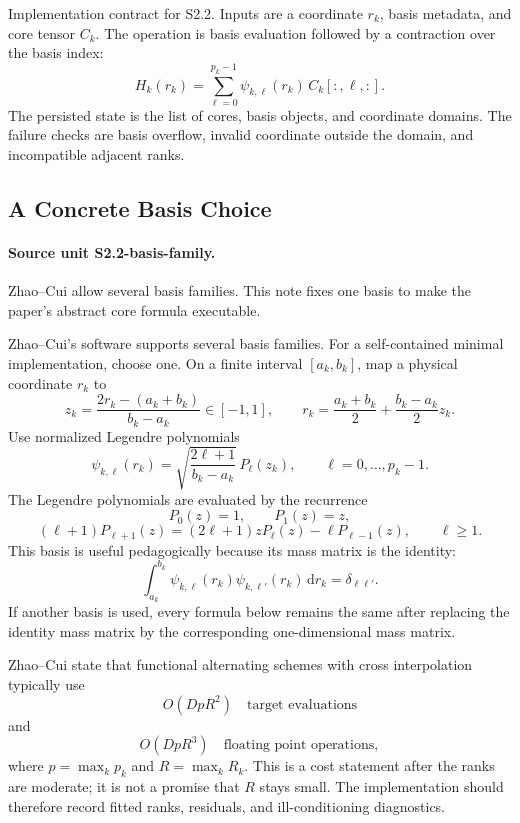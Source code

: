 \documentclass[11pt]{article}
\newcommand{\dd}{\,\mathrm d}
\begin{document}
Implementation contract for S2.2.  Inputs are a coordinate \(r_k\), basis
metadata, and core tensor \(C_k\).  The operation is basis evaluation followed
by a contraction over the basis index:
\[
    H_k(r_k)=\sum_{\ell=0}^{p_k-1}\psi_{k,\ell}(r_k)\,C_k[:,\ell,:].
    \tag{TT-3a}
\]
The persisted state is the list of cores, basis objects, and coordinate
domains.  The failure checks are basis overflow, invalid coordinate outside the
domain, and incompatible adjacent ranks.

\subsection{A Concrete Basis Choice}

\paragraph{Source unit S2.2-basis-family.}
Zhao--Cui allow several basis families.  This note fixes one basis to make the
paper's abstract core formula executable.

Zhao--Cui's software supports several basis families.  For a self-contained
minimal implementation, choose one.  On a finite interval
\([a_k,b_k]\), map a physical coordinate \(r_k\) to
\[
    z_k=\frac{2r_k-(a_k+b_k)}{b_k-a_k}\in[-1,1],
    \qquad
    r_k=\frac{a_k+b_k}{2}+\frac{b_k-a_k}{2}z_k.
    \tag{TT-6}
\]
Use normalized Legendre polynomials
\[
    \psi_{k,\ell}(r_k)
    =
    \sqrt{\frac{2\ell+1}{b_k-a_k}}\,
    P_\ell(z_k),
    \qquad \ell=0,\ldots,p_k-1.
    \tag{TT-7}
\]
The Legendre polynomials are evaluated by the recurrence
\[
    P_0(z)=1,\qquad P_1(z)=z,
\]
\[
    (\ell+1)P_{\ell+1}(z)
    =
    (2\ell+1)zP_\ell(z)-\ell P_{\ell-1}(z),
    \qquad \ell\ge1.
    \tag{TT-8}
\]
This basis is useful pedagogically because its mass matrix is the identity:
\[
    \int_{a_k}^{b_k}\psi_{k,\ell}(r_k)\psi_{k,\ell'}(r_k)\dd r_k
    =
    \delta_{\ell\ell'}.
    \tag{TT-9}
\]
If another basis is used, every formula below remains the same after replacing
the identity mass matrix by the corresponding one-dimensional mass matrix.

Zhao--Cui state that functional alternating schemes with cross interpolation
typically use
\[
    O(DpR^2)\quad\text{target evaluations}
    \tag{TT-10}
\]
and
\[
    O(DpR^3)\quad\text{floating point operations},
    \tag{TT-11}
\]
where \(p=\max_k p_k\) and \(R=\max_k R_k\).  This is a cost statement after
the ranks are moderate; it is not a promise that \(R\) stays small.  The
implementation should therefore record fitted ranks, residuals, and
ill-conditioning diagnostics.
\end{document}
